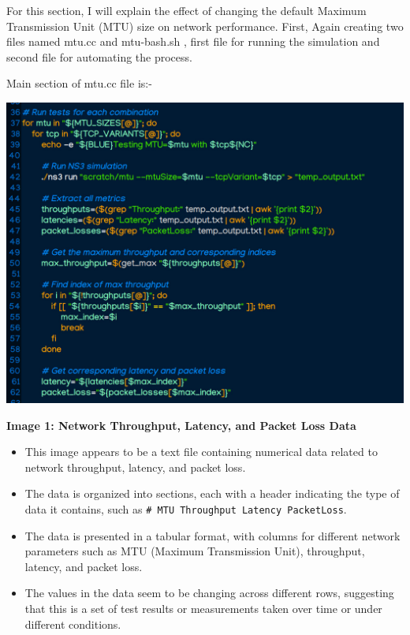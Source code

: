 \documentclass[11pt,a4paper]{article}
\begin{document}
For this section, I will explain the effect of changing the default Maximum Transmission Unit (MTU) size on network performance.
First, Again creating two files named mtu.cc and mtu-bash.sh , first file for running the simulation and second file for automating the process.\\

\begin{tcolorbox}[colframe=blue!70!black, colback=blue!5!white, boxrule=0.4pt, width=\textwidth, sharp corners]
Main section of mtu.cc file is:-
\begin{center}
    \includegraphics[width=1\columnwidth]{images/mtu-sim.jpg}
\end{center}
    \item \textbf{Image 1: Network Throughput, Latency, and Packet Loss Data}
    \begin{itemize}
    \item This image appears to be a text file containing numerical data related to network throughput, latency, and packet loss.
    \item The data is organized into sections, each with a header indicating the type of data it contains, such as \texttt{# MTU Throughput Latency PacketLoss}.
    \item The data is presented in a tabular format, with columns for different network parameters such as MTU (Maximum Transmission Unit), throughput, latency, and packet loss.
    \item The values in the data seem to be changing across different rows, suggesting that this is a set of test results or measurements taken over time or under different conditions.
    \end{itemize}
\end{tcolorbox}
\end{document}
